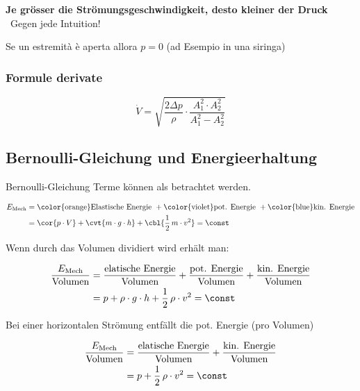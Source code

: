 \textbf{Je grösser die Strömungsgeschwindigkeit, desto kleiner der Druck} \\
\textrightarrow\ Gegen jede Intuition!

Se un estremità è aperta allora $p=0$ (ad Esempio in una siringa)

\subsubsection*{Formule derivate}

$$\dot{V} = \sqrt{\frac{2\Delta p}{\rho} \cdot \frac{A_1^2\cdot A_2^2}{A_1^2 - A_2^2}}$$

\subsection{Bernoulli-Gleichung und Energieerhaltung}

Bernoulli-Gleichung Terme können als  betrachtet werden.

\vspace{-0.3cm}

\begin{align*}
	E_{\rm Mech}	&= \text{\color{orange}Elastische Energie } + \text{\color{violet}pot. Energie } + \text{\color{blue}kin. Energie} \\
					&= \cor{p \cdot V} + \cvt{m \cdot g \cdot h} + \cbl{\frac{1}{2} \, m \cdot v^2} = \const
\end{align*}

Wenn durch das Volumen dividiert wird erhält man: 

\vspace{-0.3cm}

\begin{align*}
	\frac{E_{\rm Mech}}{\text{Volumen}}	&= \frac{\text{elatische Energie}}{\text{Volumen}} + \frac{\text{pot. Energie}}{\text{Volumen}} + \frac{\text{kin. Energie}}{\text{Volumen}} \\
										&= p + \rho \cdot g \cdot h + \frac{1}{2} \, \rho \cdot v^2 = \const
\end{align*}

Bei einer horizontalen Strömung entfällt die pot. Energie (pro Volumen)

\vspace{-0.3cm}

\begin{align*}
	\frac{E_{\rm Mech}}{\text{Volumen}}	&= \frac{\text{elatische Energie}}{\text{Volumen}} + \frac{\text{kin. Energie}}{\text{Volumen}} \\
										&= p + \frac{1}{2} \, \rho \cdot v^2 = \const
\end{align*}


